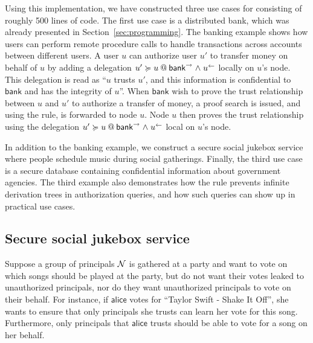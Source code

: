 Using this implementation, we have constructed three use cases for \lang{} consisting of roughly 500 lines of code. The first use case is a distributed bank, which was already presented in Section~\ref{sec:programming}. The banking example shows how users can perform remote procedure calls to handle transactions across accounts between different users. A user $u$ can authorize user $u'$ to transfer money on behalf of $u$ by adding a delegation $\lb{\conf{\mathsf{bank}} \conj \integ{u}}{u' \actsfor u}$ locally on $u$'s node. This delegation is read as ``$u$ trusts $u'$, and this information is confidential to $\mathsf{bank}$ and has the integrity of $u$''. When $\mathsf{bank}$ wish to prove the trust relationship between $u$ and $u'$ to authorize a transfer of money, a proof search is issued, and using the  rule, is forwarded to node $u$. Node $u$ then proves the trust relationship using the delegation $\lb{\conf{\mathsf{bank}} \conj \integ{u}}{u' \actsfor u}$ local on $u$'s node.

In addition to the banking example, we construct a secure social jukebox service where people schedule music during social gatherings. Finally, the third use case is a secure database containing confidential information about government agencies. The third example also demonstrates how the  rule prevents infinite derivation trees in authorization queries, and how such queries can show up in practical use cases.

\subsection{Secure social jukebox service}\label{subsec:jukebox}
Suppose a group of principals $\Nameset$ is gathered at a party and want to vote on which songs should be played at the party, but do not want their votes leaked to unauthorized principals, nor do they want unauthorized principals to vote on their behalf.
For instance, if $\mathsf{alice}$ votes for ``Taylor Swift - Shake It Off'', she wants to ensure that only principals she trusts can learn her vote for this song. Furthermore, only principals that $\mathsf{alice}$ trusts should be able to vote for a song on her behalf.

